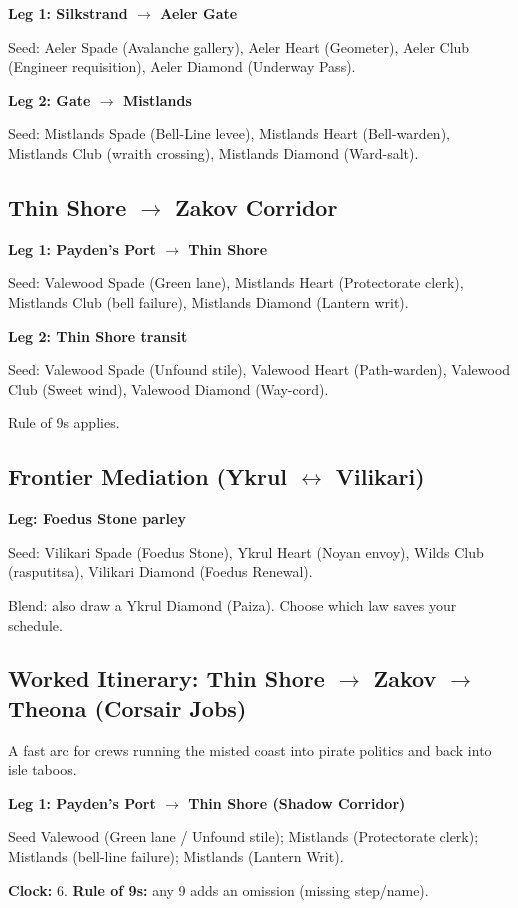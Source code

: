 \textbf{Leg 1: Silkstrand $\rightarrow$ Aeler Gate}

Seed: Aeler Spade (Avalanche gallery), Aeler Heart (Geometer), Aeler Club (Engineer requisition), Aeler Diamond (Underway Pass).

\textbf{Leg 2: Gate $\rightarrow$ Mistlands}

Seed: Mistlands Spade (Bell-Line levee), Mistlands Heart (Bell-warden), Mistlands Club (wraith crossing), Mistlands Diamond (Ward-salt).

\subsection{Thin Shore $\rightarrow$ Zakov Corridor}

\textbf{Leg 1: Payden's Port $\rightarrow$ Thin Shore}

Seed: Valewood Spade (Green lane), Mistlands Heart (Protectorate clerk), Mistlands Club (bell failure), Mistlands Diamond (Lantern writ).

\textbf{Leg 2: Thin Shore transit}

Seed: Valewood Spade (Unfound stile), Valewood Heart (Path-warden), Valewood Club (Sweet wind), Valewood Diamond (Way-cord).

Rule of 9s applies.

\subsection{Frontier Mediation (Ykrul $\leftrightarrow$ Vilikari)}

\textbf{Leg: Foedus Stone parley}

Seed: Vilikari Spade (Foedus Stone), Ykrul Heart (Noyan envoy), Wilds Club (rasputitsa), Vilikari Diamond (Foedus Renewal).

Blend: also draw a Ykrul Diamond (Paiza). Choose which law saves your schedule.

\subsection{Worked Itinerary: Thin Shore $\rightarrow$ Zakov $\rightarrow$ Theona (Corsair Jobs)}
A fast arc for crews running the misted coast into pirate politics and back into isle taboos.

\textbf{Leg 1: Payden's Port $\rightarrow$ Thin Shore (Shadow Corridor)}
\begin{Leg}{Seed}
Valewood \SuitSpade{} (Green lane / Unfound stile);
Mistlands \SuitHeart{} (Protectorate clerk);
Mistlands \SuitClub{} (bell-line failure);
Mistlands \SuitDiamond{} (Lantern Writ).
\end{Leg}
\textbf{Clock:} 6. \textbf{Rule of 9s:} any 9 adds an omission (missing step/name).

